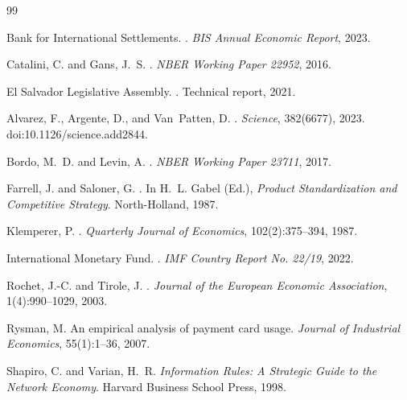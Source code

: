 \documentclass{article}
\begin{document}
\begin{thebibliography}{99}

Bank for International Settlements.
.
\newblock \emph{BIS Annual Economic Report}, 2023.

Catalini, C. and Gans, J.~S.
.
\newblock \emph{NBER Working Paper 22952}, 2016.

El Salvador Legislative Assembly.
.
\newblock Technical report, 2021.

Alvarez, F., Argente, D., and Van~Patten, D.
.
\newblock \emph{Science}, 382(6677), 2023.
\newblock doi:10.1126/science.add2844.

Bordo, M.~D. and Levin, A.
.
\newblock \emph{NBER Working Paper 23711}, 2017.

Farrell, J. and Saloner, G.
.
\newblock In H.~L. Gabel (Ed.), \emph{Product Standardization and Competitive
Strategy}. North-Holland, 1987.

Klemperer, P.
.
\newblock \emph{Quarterly Journal of Economics}, 102(2):375--394, 1987.

International Monetary Fund.
.
\newblock \emph{IMF Country Report No. 22/19}, 2022.

Rochet, J.-C. and Tirole, J.
.
\newblock \emph{Journal of the European Economic Association}, 1(4):990--1029,
2003.

Rysman, M.
\newblock An empirical analysis of payment card usage.
\newblock \emph{Journal of Industrial Economics}, 55(1):1--36, 2007.

Shapiro, C. and Varian, H.~R.
\newblock \emph{Information Rules: A Strategic Guide to the Network Economy}.
\newblock Harvard Business School Press, 1998.


\end{thebibliography}
\end{document}
